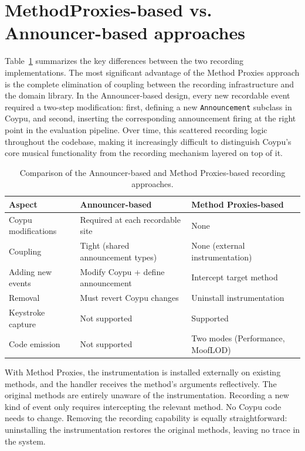 \documentclass[
]{ceurart}
\begin{document}
\section{MethodProxies-based vs. Announcer-based approaches}

Table~\ref{tab:comparison} summarizes the key differences between the two recording implementations. The most significant advantage of the Method Proxies approach is the complete elimination of coupling between the recording infrastructure and the domain library. In the Announcer-based design, every new recordable event required a two-step modification: first, defining a new \texttt{Announcement} subclass in Coypu, and second, inserting the corresponding announcement firing at the right point in the evaluation pipeline. Over time, this scattered recording logic throughout the codebase, making it increasingly difficult to distinguish Coypu's core musical functionality from the recording mechanism layered on top of it.

\begin{table}[ht]
\centering
\caption{Comparison of the Announcer-based and Method Proxies-based recording approaches.}
\label{tab:comparison}
\begin{tabular}{lll}
\toprule
\textbf{Aspect} & \textbf{Announcer-based} & \textbf{Method Proxies-based} \\
\midrule
Coypu modifications & Required at each recordable site & None \\
Coupling & Tight (shared announcement types) & None (external instrumentation) \\
Adding new events & Modify Coypu + define announcement & Intercept target method \\
Removal & Must revert Coypu changes & Uninstall instrumentation \\
Keystroke capture & Not supported & Supported \\
Code emission & Not supported & Two modes (Performance, MoofLOD) \\
\bottomrule
\end{tabular}
\end{table}

With Method Proxies, the instrumentation is installed externally on existing methods, and the handler receives the method's arguments reflectively. The original methods are entirely unaware of the instrumentation. Recording a new kind of event only requires intercepting the relevant method. No Coypu code needs to change.
Removing the recording capability is equally straightforward: uninstalling the instrumentation restores the original methods, leaving no trace in the system.
\end{document}
